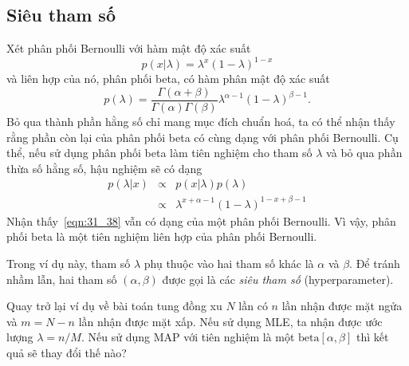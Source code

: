 \subsection{Siêu tham số}
Xét phân phối Bernoulli với hàm mật độ xác suất
\begin{equation} 
  p(x | \lambda) = \lambda^x ( 1 - \lambda)^{1 - x}
\end{equation} 
và liên hợp của nó, phân phối beta, có hàm phân mật độ xác suất
\begin{equation} 
  p(\lambda) = \frac{\Gamma(\alpha + \beta)}{\Gamma(\alpha) \Gamma(\beta)} \lambda^{\alpha - 1} ( 1 - \lambda) ^{\beta - 1}.
\end{equation} 
Bỏ qua thành phần hằng số chỉ mang mục đích chuẩn hoá, ta có thể nhận thấy rằng
phần còn lại của phân phối beta có cùng dạng với phân phối Bernoulli. Cụ thể,
nếu sử dụng phân phối beta làm tiên nghiệm cho tham số $\lambda$ và bỏ qua
phần thừa số hằng số, hậu nghiệm sẽ có dạng
\begin{eqnarray} 
\nonumber 
  p(\lambda | x) & \propto & p(x | \lambda) p(\lambda) \\\ 
  \label{eqn:31_38}
      & \propto & \lambda^{x + \alpha - 1}(1 - \lambda)^{1 - x + \beta - 1}
\end{eqnarray}  
Nhận thấy~\eqref{eqn:31_38} {vẫn có dạng của một phân phối
Bernoulli.} Vì vậy, phân phối beta là một tiên nghiệm liên hợp của phân phối Bernoulli.

Trong ví dụ này, tham số $\lambda$ phụ thuộc vào hai tham số khác là $\alpha$ và
$\beta$. Để tránh nhầm lẫn, hai tham số $(\alpha, \beta)$ được gọi là các
\textit{siêu tham số} (hyperparameter). 
 
Quay trở lại ví dụ về bài toán tung đồng xu $N$ lần có $n$ lần nhận được mặt
ngửa và $m = N - n$ lần nhận được mặt xấp. Nếu sử dụng MLE,
ta nhận được ước lượng $\lambda = n/M$. Nếu sử dụng MAP với tiên nghiệm là một
$\text{beta}[\alpha, \beta]$ thì kết quả sẽ thay đổi thế nào? 
 
